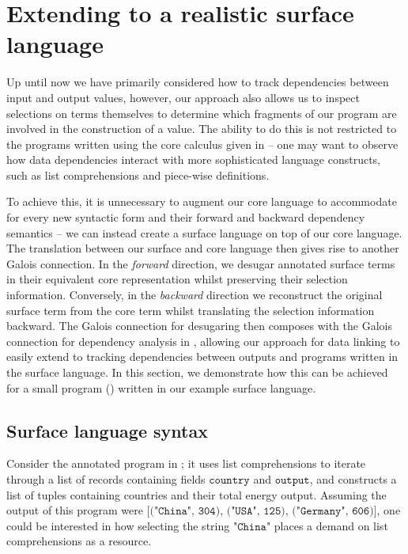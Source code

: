 \newpage
\section{Extending to a realistic surface language}
\label{sec:surface-language}

Up until now we have primarily considered how to track dependencies between input and output values, however, our approach also allows us to inspect selections on terms themselves to determine which fragments of our program are involved in the construction of a value. The ability to do this is not restricted to the programs written using the core calculus given in  -- one may want to observe how data dependencies interact with more sophisticated language constructs, such as list comprehensions and piece-wise definitions.

To achieve this, it is unnecessary to augment our core language to accommodate for every new syntactic form and their forward and backward dependency semantics -- we can instead create a surface language on top of our core language. The translation between our surface and core language then gives rise to another Galois connection. In the \textit{forward} direction, we desugar annotated surface terms in their equivalent core representation whilst preserving their selection information. Conversely, in the \textit{backward} direction we reconstruct the original surface term from the core term whilst translating the selection information backward. The Galois connection for desugaring then composes with the Galois connection for dependency analysis in , allowing our approach for data linking to easily extend to tracking dependencies between outputs and programs written in the surface language. In this section, we demonstrate how this can be achieved for a small program () written in our example surface language.



\subsection{Surface language syntax}

Consider the annotated program in ; it uses list comprehensions to iterate through a list of records containing fields $\texttt{country}$ and $\texttt{output}$, and constructs a list of tuples containing countries and their total energy output. Assuming the output of this program were $\texttt{[("China", 304), ("USA", 125),}$ $\texttt{("Germany", 606)]}$, one could be interested in how selecting the string $\texttt{"China"}$ places a demand on list comprehensions as a resource.

